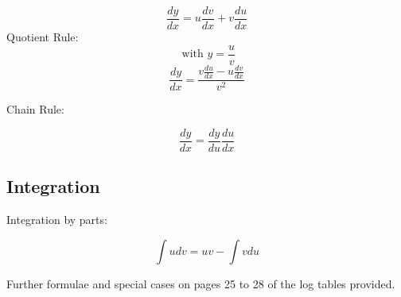 \documentclass[a4paper,12pt]{article}
\begin{document}
\[ \frac{dy}{dx} = u \frac{dv}{dx} +  v \frac{du}{dx} \]
\bigskip
\noindent Quotient Rule: \[ \mbox{ with } y = \frac{u}{v}\]
\[ \frac{dy}{dx}  = \frac{v \frac{du}{dx} - u \frac{dv}{dx} }{v^2} \]
\bigskip


\noindent Chain Rule:

	\[ \frac{dy}{dx} = \frac{dy}{du} \frac{du}{dx}  \]


\subsection*{Integration}

Integration by parts: 

\[ \int u dv = uv - \int v du \]  

\noindent Further formulae and special cases on pages 25 to 28 of the log tables provided.
\end{document}
